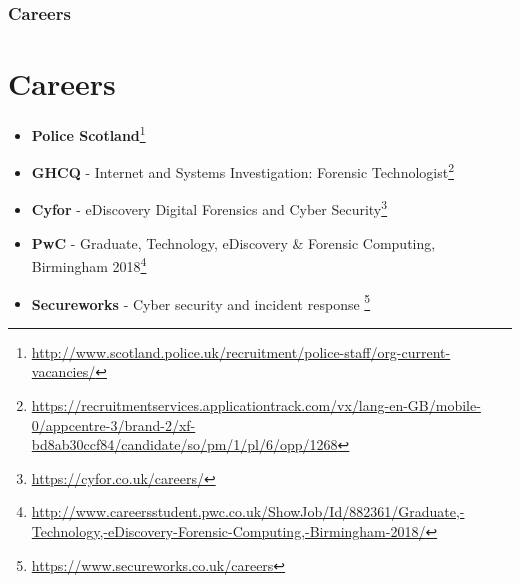 \documentclass{beamer}
\begin{document}
\begin{frame}
	\frametitle{Careers}
	\section{Careers}
	\begin{itemize}
		\item \textbf{Police Scotland}\footnote{\tiny\url{http://www.scotland.police.uk/recruitment/police-staff/org-current-vacancies/}}
		\item \textbf{GHCQ} - Internet and Systems Investigation: Forensic Technologist\footnote{\tiny\url{https://recruitmentservices.applicationtrack.com/vx/lang-en-GB/mobile-0/appcentre-3/brand-2/xf-bd8ab30ccf84/candidate/so/pm/1/pl/6/opp/1268}}
		\item \textbf{Cyfor} - eDiscovery Digital Forensics and Cyber Security\footnote{\tiny\url{https://cyfor.co.uk/careers/}}
		\item \textbf{PwC} - Graduate, Technology, eDiscovery {\&} Forensic Computing, Birmingham 2018\footnote{\tiny\url{http://www.careersstudent.pwc.co.uk/ShowJob/Id/882361/Graduate,-Technology,-eDiscovery-Forensic-Computing,-Birmingham-2018/}}
		\item \textbf{Secureworks} - Cyber security and incident response \footnote{\tiny\url{https://www.secureworks.co.uk/careers}}
	\end{itemize}
\end{frame}
\end{document}
